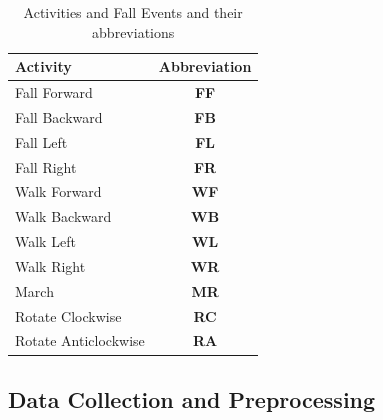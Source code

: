 \documentclass[]{IEEEtran}
\begin{document}
\begin{table}[htb]
\caption{Activities and Fall Events and their abbreviations}
\centering
{
\begin{tabular}{|l|c|}
\hline
\textbf{Activity} & \textbf{Abbreviation} \\  \hline
Fall Forward &\textbf{FF} \\ \hline
Fall Backward &\textbf{FB}  \\ \hline
Fall Left &\textbf{FL}  \\ \hline
Fall Right &\textbf{FR}  \\ \hline \hline
Walk Forward &\textbf{WF} \\ \hline
Walk Backward &\textbf{WB} \\ \hline
Walk Left &\textbf{WL} \\ \hline
Walk Right &\textbf{WR}  \\ \hline
March &\textbf{MR}  \\ \hline
Rotate Clockwise &\textbf{RC} \\ \hline
Rotate Anticlockwise&\textbf{RA}  \\ \hline
\end{tabular}
}
\label{Tbl:ListOfActivities}
\end{table}

\subsection{Data Collection and Preprocessing  }
\label{subsec:preDataCollection}
\end{document}
